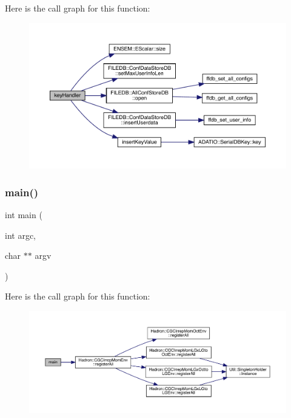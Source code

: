 Here is the call graph for this function\+:
\nopagebreak
\begin{figure}[H]
\begin{center}
\leavevmode
\includegraphics[width=350pt]{d6/d54/adat-devel_2main_2dbutil_2dbavgcors_8cc_a57918e290614430413950cb4fdfd967e_cgraph}
\end{center}
\end{figure}
\mbox{\label{adat-devel_2main_2dbutil_2dbavgcors_8cc_a3c04138a5bfe5d72780bb7e82a18e627}} 
\subsubsection{\texorpdfstring{main()}{main()}}
{\footnotesize\ttfamily int main (\begin{DoxyParamCaption}\item[{int}]{argc,  }\item[{char $\ast$$\ast$}]{argv }\end{DoxyParamCaption})}

Here is the call graph for this function\+:
\nopagebreak
\begin{figure}[H]
\begin{center}
\leavevmode
\includegraphics[width=350pt]{d6/d54/adat-devel_2main_2dbutil_2dbavgcors_8cc_a3c04138a5bfe5d72780bb7e82a18e627_cgraph}
\end{center}
\end{figure}
\mbox{\label{adat-devel_2main_2dbutil_2dbavgcors_8cc_ad99136392a8c4064c84803fee6e0c857}} 
